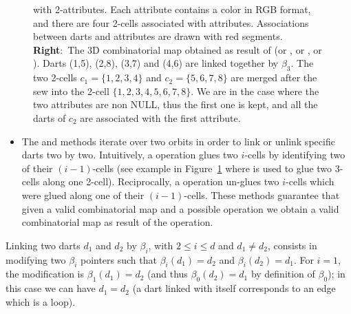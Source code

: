 \begin{figure}
{    with 2-attributes. Each attribute contains a color in RGB format,
    and there are four 2-cells associated with attributes.
    Associations between darts and attributes are drawn with red
    segments. \textbf{Right}:~The 3D combinatorial map obtained as
    result of  (or , or
    , or ). Darts (1,5), (2,8),
    (3,7) and (4,6) are linked together by $\beta_3$. The two 2-cells
    $c_1=\{1,2,3,4\}$ and $c_2=\{5,6,7,8\}$ are merged after the sew
    into the 2-cell $\{1,2,3,4,5,6,7,8\}$. We are in the case where
    the two attributes are non NULL, thus the first one is kept, and
    all the darts of $c_2$ are associated with the first attribute.}
  \label{fig-exemple-sew}
\end{figure}
\begin{itemize}
\item The  and  methods iterate over two orbits in
  order to link or unlink specific darts two by two.  Intuitively, a
   operation glues two $i$-cells by identifying two of
  their $(i-1)$-cells (see example in Figure~\ref{fig-exemple-sew}
  where  is used to glue two 3-cells along one 2-cell).
  Reciprocally, a  operation un-glues two $i$-cells which
  were glued along one of their $(i-1)$-cells.
  These methods guarantee that given a valid combinatorial map and a
  possible operation we obtain a valid combinatorial map as result of
  the operation.

\end{itemize}

Linking two darts $d_1$ and $d_2$ by $\beta_i$, with $2\leq i\leq d$
and $d_1 \neq d_2$, consists in modifying two $\beta_i$ pointers such that
$\beta_i(d_1)=d_2$ and $\beta_i(d_2)=d_1$. For $i=1$, the modification
is $\beta_1(d_1)=d_2$ (and thus $\beta_0(d_2)=d_1$ by definition of
$\beta_0$); in this case we can have $d_1=d_2$ (a dart linked with
itself corresponds to an edge which is a loop).

